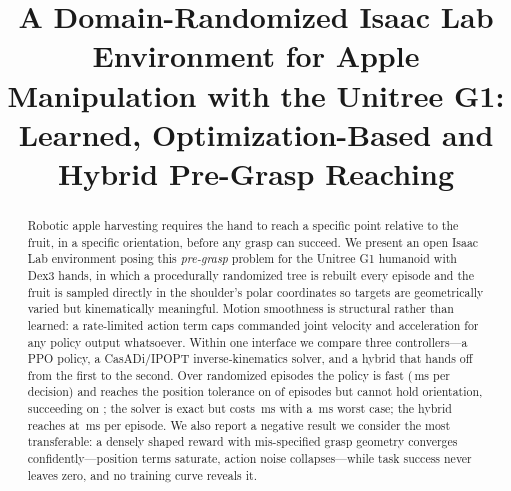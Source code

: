\documentclass[conference]{IEEEtran}
\begin{document}
\title{A Domain-Randomized Isaac Lab Environment for Apple Manipulation with the Unitree G1: Learned, Optimization-Based and Hybrid Pre-Grasp Reaching}

\author{
\and
{}
\and
{}
\and
{}
}

\maketitle

\begin{abstract}
Robotic apple harvesting requires the hand to reach a specific point relative to
the fruit, in a specific orientation, before any grasp can succeed. We present an
open Isaac Lab environment posing this \emph{pre-grasp} problem for the Unitree
G1 humanoid with Dex3 hands, in which a procedurally randomized tree is rebuilt
every episode and the fruit is sampled directly in the shoulder's polar
coordinates so targets are geometrically varied but kinematically meaningful.
Motion smoothness is structural rather than learned: a rate-limited action term
caps commanded joint velocity and acceleration for any policy output whatsoever.
Within one interface we compare three controllers---a PPO policy, a CasADi/IPOPT
inverse-kinematics solver, and a hybrid that hands off from the first to the
second. Over \RESnepisodes{} randomized episodes the policy is fast
(\RLforward{}\,ms per decision) and reaches the position tolerance on
\RESposonly{} of episodes but cannot hold orientation, succeeding on
\RESsuccess{}; the solver is exact but costs \CASsolveMed{}\,ms with a
\CASsolveMax{}\,ms worst case; the hybrid reaches \HYBsuccess{} at
\HYBcompute{}\,ms per episode. We also report a negative result we consider the
most transferable: a densely shaped reward with mis-specified grasp geometry
converges confidently---position terms saturate, action noise collapses---while
task success never leaves zero, and no training curve reveals it.
\end{abstract}
\end{document}
